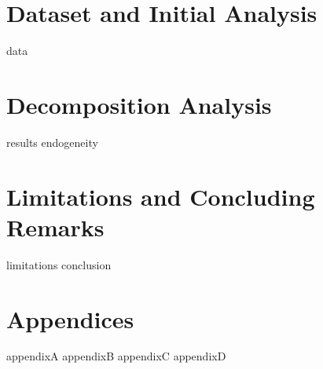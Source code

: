\documentclass[openany,a4paper,12pt]{book}
\begin{document}
\chapter{Dataset and Initial Analysis} %
\label{sec:Dataset}
{data}

\chapter{Decomposition Analysis} %
\label{sec:Analysis}
{results} %
{endogeneity} %

\chapter{Limitations and Concluding Remarks} %
\label{sec:Limitations}
{limitations} %
{conclusion} %
\label{sec:Bibliography}

\chapter{Appendices}
\label{sec:appendices}
\newpage
{appendixA}
\newpage
{appendixB}
\newpage
{appendixC}
\newpage
{appendixD}
\backmatter


\printglossary[type=\acronymtype, nonumberlist]
\end{document}
